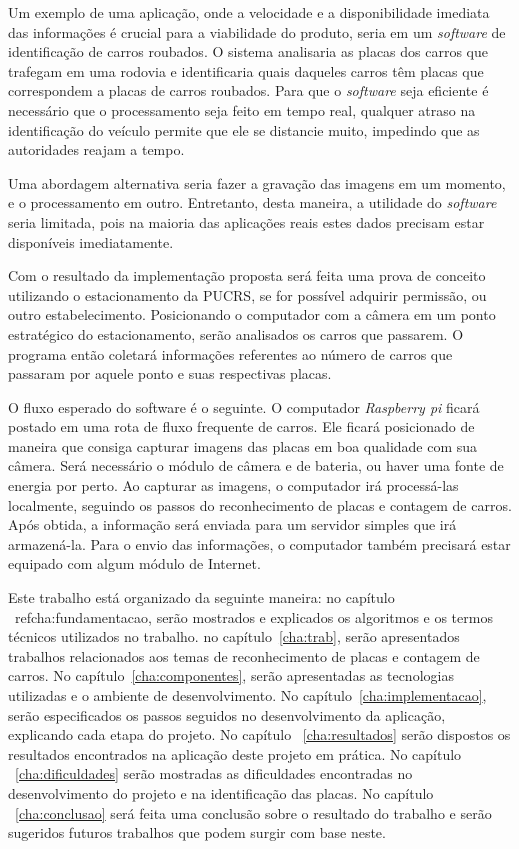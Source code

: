 Um exemplo de uma aplicação, onde a velocidade e a disponibilidade imediata das
informações é crucial para a viabilidade do produto, seria em um \emph{software}
de identificação de carros roubados. O sistema analisaria as placas dos carros
que trafegam em uma rodovia e identificaria quais daqueles carros têm placas que
correspondem a placas de carros roubados. Para que o \emph{software} seja
eficiente é necessário que o processamento seja feito em tempo real, qualquer
atraso na identificação do veículo permite que ele se distancie muito, impedindo
que as autoridades reajam a tempo.

Uma abordagem alternativa seria fazer a gravação das imagens em um momento, e o
processamento em outro. Entretanto, desta maneira, a utilidade do
\emph{software} seria limitada, pois na maioria das aplicações reais estes dados
precisam estar disponíveis imediatamente.

Com o resultado da implementação proposta será feita uma prova de conceito
utilizando o estacionamento da PUCRS, se for possível adquirir permissão, ou outro estabelecimento.
Posicionando o computador com a câmera em um ponto estratégico do
estacionamento, serão analisados os carros que passarem. O programa então
coletará informações referentes ao número de carros que passaram por aquele ponto
e suas respectivas placas.

O fluxo esperado do software é o seguinte. O computador \emph{Raspberry pi} ficará
postado em uma rota de fluxo frequente de carros. Ele ficará posicionado de
maneira que consiga capturar imagens das placas em boa qualidade com sua câmera.
Será necessário o módulo de câmera e de bateria, ou haver uma fonte de energia
por perto. Ao capturar as imagens, o computador irá processá-las localmente,
seguindo os passos do reconhecimento de placas e contagem de carros.  Após
obtida, a informação será enviada para um servidor simples que irá armazená-la.
Para o envio das informações, o computador também precisará estar equipado com
algum módulo de Internet.

Este trabalho está organizado da seguinte maneira: no capítulo ~ref{cha:fundamentacao}, serão mostrados e explicados os algoritmos e os termos técnicos utilizados no trabalho. no capítulo~\ref{cha:trab},
serão apresentados trabalhos relacionados aos temas de reconhecimento de placas
e contagem de carros. No capítulo~\ref{cha:componentes}, serão apresentadas as tecnologias utilizadas e o ambiente de desenvolvimento. No capítulo~\ref{cha:implementacao}, serão especificados os passos seguidos no desenvolvimento da aplicação, explicando cada etapa do projeto. No capítulo ~\ref{cha:resultados} serão dispostos os resultados encontrados na aplicação deste projeto em prática. No capítulo ~\ref{cha:dificuldades} serão mostradas as dificuldades encontradas no desenvolvimento do projeto e na identificação das placas. No capítulo ~\ref{cha:conclusao} será feita uma conclusão sobre o resultado do trabalho e serão sugeridos futuros trabalhos que podem surgir com base neste.
